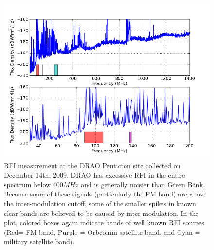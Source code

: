 \begin{figure}[htb]
\begin{center}
\includegraphics[width=0.9\linewidth]{RFI_testing/figures/DRAO_bands.png}
\caption{RFI measurement at the DRAO Penticton site collected on December 14th, 2009. DRAO has excessive RFI in the entire spectrum below $400 MHz$ and is generally noisier than Green Bank. Because some of these signals (particularly the FM band) are above the inter-modulation cutoff, some of the smaller spikes in known clear bands are believed to be caused by inter-modulation. In the plot, colored boxes again indicate bands of well known RFI sources (Red= FM band, Purple = Orbcomm satellite band, and Cyan = military satellite band).   }
\label{Fig:draorfi}
\end{center}
\end{figure}


